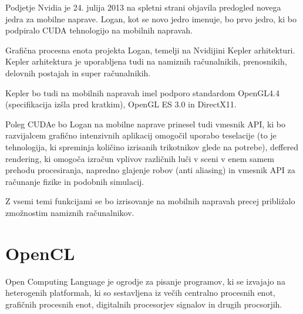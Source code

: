 


Podjetje Nvidia je 24. julija 2013 \cite{cuda-mobile} na spletni strani objavila predogled novega jedra za mobilne naprave. Logan, kot se novo jedro imenuje, bo prvo jedro, ki bo podpiralo CUDA tehnologijo na mobilnih napravah.

Grafična procesna enota projekta Logan, temelji na Nvidijini Kepler arhitekturi. Kepler arhitektura je uporabljena tudi na namiznih računalnikih, prenosnikih, delovnih postajah in super računalnikih.

Kepler bo tudi na mobilnih napravah imel podporo standardom OpenGL4.4 (specifikacija izšla pred kratkim), OpenGL ES 3.0 in DirectX11.

Poleg CUDAe bo Logan na mobilne naprave prinesel tudi vmesnik API, ki bo razvijalcem grafično intenzivnih aplikacij omogočil uporabo teselacije (to je tehnologija, ki spreminja količino izrisanih trikotnikov glede na potrebe), deffered rendering, ki omogoča izračun vplivov različnih luči v sceni v enem samem prehodu procesiranja, napredno glajenje robov (anti aliasing) in vmesnik API za računanje fizike in podobnih simulacij.

Z vsemi temi funkcijami se bo izrisovanje na mobilnih napravah precej približalo zmožnostim namiznih računalnikov. 
 

\section{OpenCL}

Open Computing Language je ogrodje za pisanje programov, ki se izvajajo na heterogenih platformah, ki so sestavljena iz večih centralno procesnih enot, grafičnih procesnih enot, digitalnih procesorjev signalov in drugih procsorjih.


